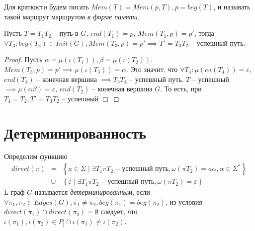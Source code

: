 Для краткости будем писать $Mem(T) = Mem(p, T), p = beg(T)$, и называть такой маршрут маршрутом \emph{в форме памяти}. 

\begin{lemma}
    \label{mem_continue_lemma}
    Пусть $T=T_1 T_2$ -- путь в $G$, $end(T_1) = p$, $Mem(T_1, p) = p'$, тогда $\forall T_3 : beg(T_3) \in Init(G), Mem(T_3, p) = p' \implies T' = T_3 T_2$ -- успешный путь. 
\end{lemma}
\begin{proof}
    Пусть $\alpha = \mu(\iota(T_1)), \beta = \mu(\iota(T_2))$.
    $Mem(T_3, p) = p' \implies \mu(\iota(T_3)) = \alpha$.
    Это значит, что $\forall T_4 : \mu(\alpha \iota(T_4)) = \varepsilon$, $end(T_4)$ -- конечная вершина  $\implies T_3 T_4$ -- успешный путь.
    $T$ -- успешный $\implies \mu(\alpha \beta) = \varepsilon$, $end(T_2)$ -- конечная вершина $G$. 
    То есть, при $T_4 = T_2, T' = T_3 T_2$ -- успешный $\Box$ 
\end{proof}

\section{Детерминированность}
Определим функцию \begin{eqnarray*}
    direct(\pi) & = & \left\{ a \in \Sigma \mid \exists T_1 \pi T_2 - \text{успешный путь}, \omega(\pi T_2) = a \alpha, \alpha \in \Sigma^* \right\} \\
    & \cup & \left\{ \varepsilon \mid \exists T_1 \pi T_2 - \text{успешный путь}, \omega(\pi T_2) = \varepsilon \right\}
\end{eqnarray*}
L-граф $G$ называется \emph{детерминированным}, если
$\forall \pi_1, \pi_2 \in Edges(G), \pi_1 \neq \pi_2, beg(\pi_1) = beg(\pi_2)$, 
из условия $direct(\pi_1) \cap direct(\pi_2) = \emptyset$ следует, что 
$\iota(\pi_1), \iota(\pi_2) \in P_] \cap \iota(\pi_1) \neq \iota(\pi_2)$. 

\begin{figure}[h]
    \begin{minipage}[h]{0.49\linewidth}
    \end{minipage}
    \hfill
    \begin{minipage}[h]{0.49\linewidth}
    \end{minipage}
    \label{det_vs_nondet}  
  \end{figure}

